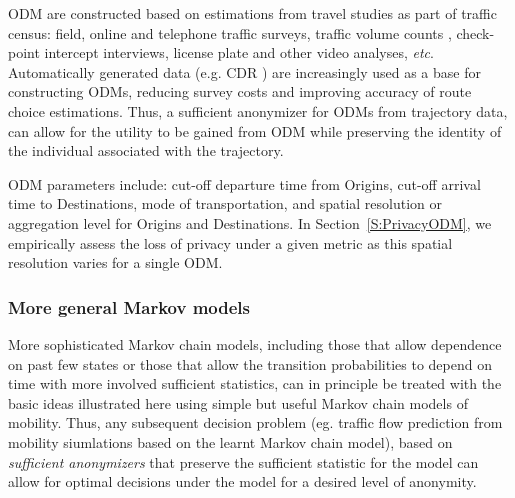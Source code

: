 \documentclass{llncs}
\begin{document}
ODM are constructed based on estimations from travel studies as part of traffic census: field, online and telephone traffic surveys, traffic volume counts \cite{robillard1975}, check-point intercept interviews, license plate and other video analyses, {\it etc}.  
Automatically generated data (e.g. CDR \cite{iqbal2014}) are increasingly used as a base for constructing ODMs, reducing survey costs and improving accuracy of route choice estimations. 
Thus, a sufficient anonymizer for ODMs from trajectory data, can allow for the utility to be gained from ODM while preserving the identity of the individual associated with the trajectory. 

ODM parameters include: cut-off departure time from Origins, cut-off arrival time to Destinations, mode of transportation, and spatial resolution or aggregation level for Origins and Destinations. 
In Section~\ref{S:PrivacyODM}, we empirically assess the loss of privacy under a given metric as this spatial resolution varies for a single ODM.  %


\subsubsection{More general Markov models}
More sophisticated Markov chain models, including those that allow dependence on past few states or those that allow the transition probabilities to depend on time with more involved sufficient statistics, can in principle be treated with the basic ideas illustrated here using simple but useful Markov chain models of mobility. 
Thus, any subsequent decision problem (eg. traffic flow prediction from mobility siumlations based on the learnt Markov chain model), based on {\em sufficient anonymizers} that preserve the sufficient statistic for the model can allow for optimal decisions under the model for a desired level of anonymity. 
\end{document}
